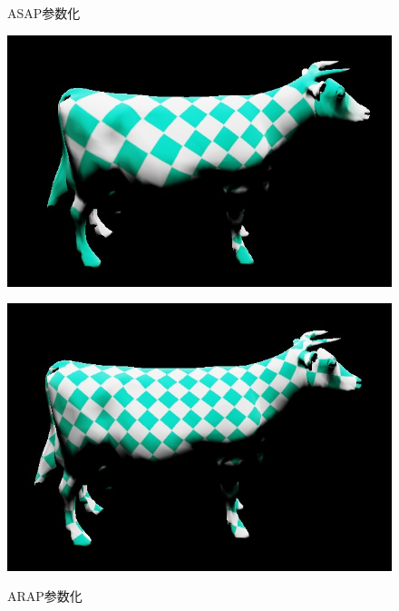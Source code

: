 \documentclass{article}
\begin{document}
	\begin{figure}[htbp]
		\centering
		\begin{minipage}{0.49\linewidth}
			\centering
			\caption{ASAP参数化}
			\includegraphics[width=0.7\linewidth]{cow_asap_tex.JPG}
			\label{chutian2}%
		\end{minipage}
		\begin{minipage}{0.49\linewidth}
			\centering
			\caption{ARAP参数化}
			\includegraphics[width=0.7\linewidth]{cow_arap_tex.JPG}
			\label{chutian2}%
		\end{minipage}
	\end{figure}
	\clearpage
\end{document}
